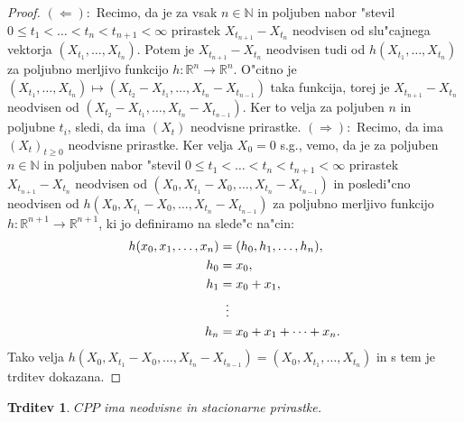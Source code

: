 \documentclass[12pt, a4paper, reqno]{amsart}
\theoremstyle{definition}
\theoremstyle{plain}
\newtheorem{trditev}[definicija]{Trditev}
\newcommand{\R}{\mathbb{R}}
\newcommand{\N}{\mathbb{N}}
\newcommand{\1}{\mathds{1}}
\begin{document}
        \begin{proof}
            $(\Leftarrow):$ Recimo, da je za vsak $n\in\N$ in poljuben nabor "stevil $0 \leq t_1 < \ldots < t_n < t_{n+1} <\infty$ 
            prirastek $X_{t_{n+1}} - X_{t_n}$ neodvisen od slu"cajnega vektorja $(X_{t_1}, \dots, X_{t_n})$.
            Potem je $X_{t_{n+1}} - X_{t_n}$ neodvisen tudi od $h(X_{t_1}, \dots, X_{t_n})$ za poljubno merljivo funkcijo $h:\R^n\to \R^n$.
            O"citno je $(X_{t_1}, \dots, X_{t_n}) \mapsto (X_{t_2} - X_{t_1}, \dots, X_{t_{n}} - X_{t_{n-1}})$ taka funkcija,
            torej je $X_{t_{n+1}} - X_{t_n}$ neodvisen od $(X_{t_2} - X_{t_1}, \dots, X_{t_{n}} - X_{t_{n-1}})$. Ker 
            to velja za poljuben $n$ in poljubne $t_i$, sledi, da ima $(X_t)$ neodvisne prirastke. \newline
            $(\Rightarrow):$  Recimo, da ima $(X_t)_{t\geq0}$ neodvisne prirastke. Ker velja $X_0 = 0$ s.g., vemo, da 
            je za poljuben $n\in\N$ in poljuben nabor "stevil $0 \leq t_1 < \ldots < t_n < t_{n+1} <\infty$
            prirastek $X_{t_{n+1}} - X_{t_n}$ neodvisen od $(X_0, X_{t_1} - X_0, \dots, X_{t_n} - X_{t_{n-1}})$ in posledi"cno neodvisen od
            $h(X_0, X_{t_1} - X_0, \dots, X_{t_n} - X_{t_{n-1}})$ za poljubno merljivo funkcijo $h:\R^{n+1}\to \R^{n+1}$, ki 
            jo definiramo na slede"c na"cin:
            \begin{align*}
                h(x_0, x_1, \dots, x_n) &= (h_0, h_1, \dots, h_n),\\
                                    h_0 &= x_0, \\
                                    h_1 &= x_0 + x_1, \\
                                    &\mathrel{\makebox[\widthof{=}]{\vdots}} \\
                                    h_n &= x_0 + x_1 + \cdots + x_n.
            \end{align*}
            Tako velja $h(X_0, X_{t_1} - X_0, \dots, X_{t_n} - X_{t_{n-1}}) = (X_0, X_{t_1}, \dots, X_{t_n})$ in s tem je trditev dokazana.

        \end{proof}

        \begin{trditev}
            $CPP$ ima neodvisne in stacionarne prirastke.
            \label{trd:neodvPrirCPP}
        \end{trditev}
\end{document}
